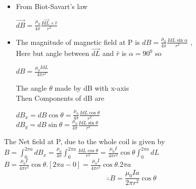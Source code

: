 \documentclass{beamer}
\begin{document}
\begin{frame}
\begin{itemize}
\item From Biot-Savart's law \\
 
 \begin{center}
$\vec{dB}=\frac{\mu_0}{4\pi}\frac{I\vec{dL}\times\hat{r}}{r^2}$\\
\end{center}

\item The magnitude of magnetic field at P is $dB=\frac{\mu_0}{4\pi}\frac{IdL \sin\alpha}{r^2}$ , \\
Here but angle between $\vec{dL}$ and $\hat{r}$ is $\alpha=90^0$ so\\
 \begin{center}
\textbf{ $dB=\frac{\mu_0 I dL}{4\pi r^2}$}
 \end{center}
The angle $\theta $ made by dB with x-axis \\
Then  Components of dB are \\
\begin{center}
 \textbf{$dB_x=dB\cos\theta=\frac{\mu_0}{4\pi} \frac{IdL\cos\theta}{r^2}$} \\
 \textbf{$dB_y=dB\sin\theta=\frac{\mu_0}{4\pi}\frac{IdL\sin\theta}{r^2}$}
\end{center}
\end{itemize}
The Net field at P, due to the whole coil is given by \\
\hspace{2cm} $B=\int_{0}^{2\pi a} dB_x=\frac{\mu_0}{4\pi} \int_{0}^{2\pi a}\frac{IdL\cos\theta}{r^2}=\frac{\mu_0 I}{4\pi r^2}\cos\theta \int_{0}^{2\pi a} dL $\\
\hspace{2cm} $B=\frac{\mu_0 I}{4\pi r^2}\cos\theta.[2\pi a -0]= \frac{\mu_0 I}{4\pi r^2}\cos\theta.2\pi a$
\begin{equation}
\therefore B=\frac{\mu_0 Ia}{2\pi r^2}\cos\theta
\end{equation}

\end{frame}
\end{document}

